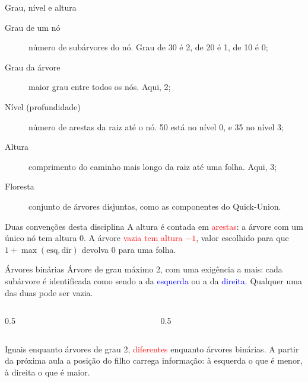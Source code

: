 \documentclass{beamer}
\newcommand{\tcb}[1]{\textcolor{blue}{#1}}
\newcommand{\tcr}[1]{\textcolor{red}{#1}}
\begin{document}
\begin{frame}{Grau, nível e altura}
  \begin{description}
    \item[Grau de um nó] número de subárvores do nó. Grau de 30 é 2, de 20 é 1,
          de 10 é 0;
    \item[Grau da árvore] maior grau entre todos os nós. Aqui, 2;
    \item[Nível (profundidade)] número de arestas da raiz até o nó. 50 está no
          nível 0, e 35 no nível 3;
    \item[Altura] comprimento do caminho mais longo da raiz até uma folha. Aqui,
          3;
    \item[Floresta] conjunto de árvores disjuntas, como as componentes do
          Quick-Union.
  \end{description}

  \vspace{0.3cm}
  \begin{block}{Duas convenções desta disciplina}
    A altura é contada em \tcr{arestas}: a árvore com um único nó tem altura 0.
    A árvore \tcr{vazia tem altura $-1$}, valor escolhido para que
    $1 + \max(\text{esq}, \text{dir})$ devolva 0 para uma folha.
  \end{block}
\end{frame}

\begin{frame}{Árvores binárias}
  Árvore de grau máximo 2, com uma exigência a mais: cada subárvore é
  identificada como sendo a da \tcb{esquerda} ou a da \tcb{direita}. Qualquer
  uma das duas pode ser vazia.

  \vspace{0.5cm}
  \begin{columns}
    \begin{column}{0.5\textwidth}
      \centering
    \end{column}
    \begin{column}{0.5\textwidth}
      \centering
    \end{column}
  \end{columns}

  \vspace{0.5cm}
  Iguais enquanto árvores de grau 2, \tcr{diferentes} enquanto árvores binárias.
  A partir da próxima aula a posição do filho carrega informação: à esquerda o
  que é menor, à direita o que é maior.
\end{frame}
\end{document}
